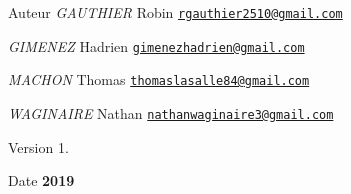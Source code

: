 \begin{DoxyAuthor}{Auteur}
{\itshape G\+A\+U\+T\+H\+I\+ER} Robin \href{mailto:rgauthier2510@gmail.com}{\tt rgauthier2510@gmail.\+com} 

{\itshape G\+I\+M\+E\+N\+EZ} Hadrien \href{mailto:gimenezhadrien@gmail.com}{\tt gimenezhadrien@gmail.\+com} 

{\itshape M\+A\+C\+H\+ON} Thomas \href{mailto:thomaslasalle84@gmail.com}{\tt thomaslasalle84@gmail.\+com} 

{\itshape W\+A\+G\+I\+N\+A\+I\+RE} Nathan \href{mailto:nathanwaginaire3@gmail.com}{\tt nathanwaginaire3@gmail.\+com} 
\end{DoxyAuthor}
\begin{DoxyVersion}{Version}
1. 
\end{DoxyVersion}
\begin{DoxyDate}{Date}
{\bfseries 2019} 
\end{DoxyDate}
